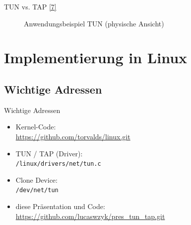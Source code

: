 \documentclass[ngerman,aspectratio=169]{beamer}
\begin{document}
\begin{frame}{TUN vs. TAP \hyperlink{ref:openvpn}{[7]}}
{\begin{figure}
				\caption{Anwendungsbeispiel TUN (physische Ansicht)}
			\end{figure}
		}
	\end{frame}

	\section{Implementierung in Linux}
	\subsection{Wichtige Adressen}
	\begin{frame}{Wichtige Adressen}
		\begin{itemize}
			\setlength\itemsep{.3cm}
			\item Kernel-Code:\\
			\url{https://github.com/torvalds/linux.git}
			
			\item TUN / TAP (Driver):\\
			\texttt{/linux/drivers/net/tun.c}
			
			\item Clone Device:\\
			\texttt{/dev/net/tun}
			
			\item diese Präsentation und Code:\\
			\url{https://github.com/lucaswzyk/pres_tun_tap.git}
		\end{itemize}
	\end{frame}
	
\end{document}

